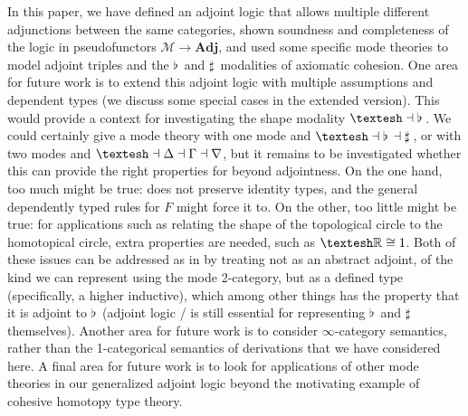 \documentclass{drl-common/llncs}
\newcommand{\M}{\ensuremath{\mathcal{M}}}
\newcommand{\la}{\ensuremath{\dashv}}
\newcommand{\sh}{\text{\textesh}}
\newcommand{\Adj}{\textbf{Adj}}
\newcommand\Flat[1]{\ensuremath{\flat \, {#1}}}
\newcommand\Sharp[1]{\ensuremath{\sharp \, {#1}}}
\begin{document}
In this paper, we have defined an adjoint logic that allows multiple
different adjunctions between the same categories, shown soundness and
completeness of the logic in pseudofunctors $\M \to \Adj$, and used some
specific mode theories to model adjoint triples and the $\Flat{}$ and
$\Sharp{}$ modalities of axiomatic cohesion.
One area for future work is to extend this adjoint logic with multiple
assumptions and dependent types (we discuss some special cases in the
extended version).  This would provide a context for investigating the
shape modality $\sh{} \la \Flat{}$.  We could certainly give a mode
theory with one mode and $\sh{} \la \Flat{} \la \Sharp{}$, or with two
modes and $\sh \la \Delta \la \Gamma \la \nabla$, but it remains to be
investigated whether this can provide the right properties for \sh{}
beyond adjointness.  On the one hand, too much might be true: \sh{} does
not preserve identity types, and the general dependently typed rules for
$F$ might force it to. On the other, too little might be true: for
applications such as relating the shape of the topological circle to the
homotopical circle, extra properties are needed, such as
$\sh{\mathbb{R}} \cong 1$.  Both of these issues can be addressed as in
\citep{shulman15realcohesion} by treating \sh{} not as an abstract
adjoint, of the kind we can represent using the mode 2-category, but as
a defined type (specifically, a higher inductive), which among other
things has the property that it is adjoint to $\Flat{}$ (adjoint logic /
is still essential for representing $\Flat{}$ and $\Sharp{}$
themselves).  Another area for future work is to consider
$\infty$-category semantics, rather than the 1-categorical semantics of
derivations that we have considered here.  A final area for future work
is to look for applications of other mode theories in our generalized
adjoint logic beyond the motivating example of cohesive homotopy type
theory.

\setlength{\bibsep}{-1.75pt} %
{ \small
\linespread{0.50}


}
\end{document}

